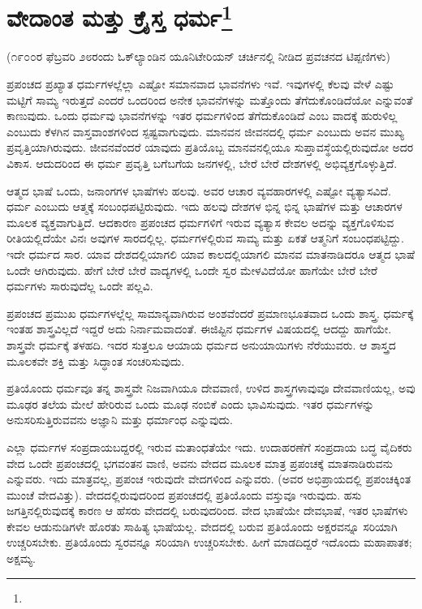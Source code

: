 
\chapter[ವೇದಾಂತ ಮತ್ತು ಕ್ರೈಸ್ತ ಧರ್ಮ]{ವೇದಾಂತ ಮತ್ತು ಕ್ರೈಸ್ತ ಧರ್ಮ\protect\footnote{}}

\begin{center}
(೧೯೦೦ರ ಫೆಬ್ರವರಿ ೨೮ರಂದು ಓಕ್‌ಲ್ಯಾಂಡಿನ ಯೂನಿಟೇರಿಯನ್ ಚರ್ಚಿನಲ್ಲಿ ನೀಡಿದ ಪ್ರವಚನದ ಟಿಪ್ಪಣಿಗಳು)
\end{center}

ಪ್ರಪಂಚದ ಪ್ರಖ್ಯಾತ ಧರ್ಮಗಳಲ್ಲೆಲ್ಲಾ ಎಷ್ಟೋ ಸಮಾನವಾದ ಭಾವನೆಗಳು ಇವೆ. ಇವುಗಳಲ್ಲಿ ಕೆಲವು ವೇಳೆ ಎಷ್ಟು ಮಟ್ಟಿಗೆ ಸಾಮ್ಯ ಇರುತ್ತದೆ ಎಂದರೆ ಒಂದರಿಂದ ಅನೇಕ ಭಾವನೆಗಳನ್ನು ಮತ್ತೊಂದು ತೆಗೆದುಕೊಂಡಿದೆಯೋ ಎನ್ನುವಂತೆ ಕಾಣುವುದು. ಒಂದು ಧರ್ಮವು ಭಾವನೆಗಳನ್ನು ಇತರ ಧರ್ಮಗಳಿಂದ ತೆಗೆದುಕೊಂಡಿದೆ ಎಂಬ ವಾದಕ್ಕೆ ಹುರುಳಿಲ್ಲ ಎಂಬುದು ಕೆಳಗಿನ ವಾಸ್ತವಾಂಶಗಳಿಂದ ಸ್ಪಷ್ಟವಾಗುವುದು. ಮಾನವನ ಜೀವನದಲ್ಲಿ ಧರ್ಮ ಎಂಬುದು ಅವನ ಮುಖ್ಯ ಪ್ರವೃತ್ತಿಯಾಗಿರುವುದು. ಜೀವನವೆಂದರೆ ಯಾವುದು ಪ್ರತಿಯೊಬ್ಬ ಮಾನವನಲ್ಲಿಯೂ ಸುಪ್ತಾವಸ್ಥೆಯಲ್ಲಿರುವುದೋ ಅದರ ವಿಕಾಸ. ಆದುದರಿಂದ ಈ ಧರ್ಮ ಪ್ರವೃತ್ತಿ ಬಗೆಬಗೆಯ ಜನಗಳಲ್ಲಿ, ಬೇರೆ ಬೇರೆ ದೇಶಗಳಲ್ಲಿ ಅಭಿವ್ಯಕ್ತಗೊಳ್ಳುತ್ತಿದೆ.

ಆತ್ಮದ ಭಾಷೆ ಒಂದು, ಜನಾಂಗಗಳ ಭಾಷೆಗಳು ಹಲವು. ಅವರ ಆಚಾರ ವ್ಯವಹಾರಗಳಲ್ಲಿ ಎಷ್ಟೋ ವ್ಯತ್ಯಾಸವಿದೆ. ಧರ್ಮ ಎಂಬುದು ಆತ್ಮಕ್ಕೆ ಸಂಬಂಧಪಟ್ಟಿರುವುದು. ಇದು ಹಲವು ದೇಶಗಳ ಭಿನ್ನ ಭಿನ್ನ ಭಾಷೆಗಳ ಮತ್ತು ಆಚಾರಗಳ ಮೂಲಕ ವ್ಯಕ್ತವಾಗುತ್ತಿದೆ. ಆದಕಾರಣ ಪ್ರಪಂಚದ ಧರ್ಮಗಳಿಗೆ ಇರುವ ವ್ಯತ್ಯಾಸ ಕೇವಲ ಅದನ್ನು ವ್ಯಕ್ತಗೊಳಿಸುವ ರೀತಿಯಲ್ಲಿದೆಯೇ ವಿನಃ ಅವುಗಳ ಸಾರದಲ್ಲಿಲ್ಲ. ಧರ್ಮಗಳಲ್ಲಿರುವ ಸಾಮ್ಯ ಮತ್ತು ಏಕತೆ ಆತ್ಮನಿಗೆ ಸಂಬಂಧಪಟ್ಟಿದ್ದು. ಇದೇ ಧರ್ಮದ ಸಾರ. ಯಾವ ದೇಶದಲ್ಲಿಯಾಗಲಿ ಯಾವ ಕಾಲದಲ್ಲಿಯಾಗಲಿ ಮಾನವ ಮಾತನಾಡಿದರೂ ಆತ್ಮದ ಭಾಷೆ ಒಂದೇ ಆಗಿರುವುದು. ಹೇಗೆ ಬೇರೆ ಬೇರೆ ವಾದ್ಯಗಳಲ್ಲಿ ಒಂದೇ ಸ್ವರ ಮೇಳವಿದೆಯೋ ಹಾಗೆಯೇ ಬೇರೆ ಬೇರೆ ಧರ್ಮಗಳು ಸಾರುವುದೆಲ್ಲ ಒಂದೇ ಪಲ್ಲವಿ.

ಪ್ರಪಂಚದ ಪ್ರಮುಖ ಧರ್ಮಗಳಲ್ಲೆಲ್ಲ ಸಾಮಾನ್ಯವಾಗಿರುವ ಅಂಶವೆಂದರೆ ಪ್ರಮಾಣಭೂತವಾದ ಒಂದು ಶಾಸ್ತ್ರ. ಧರ್ಮಕ್ಕೆ ಇಂತಹ ಶಾಸ್ತ್ರವಿಲ್ಲದೆ ಇದ್ದರೆ ಅದು ನಿರ್ನಾಮವಾದಂತೆ. ಈಜಿಪ್ಟಿನ ಧರ್ಮಗಳ ವಿಷಯದಲ್ಲಿ ಆದದ್ದು ಹಾಗೆಯೇ. ಶಾಸ್ತ್ರವೇ ಧರ್ಮಕ್ಕೆ ತಳಹದಿ. ಇದರ ಸುತ್ತಲೂ ಆಯಾಯ ಧರ್ಮದ ಅನುಯಾಯಿಗಳು ನೆರೆಯುವರು. ಆ ಶಾಸ್ತ್ರದ ಮೂಲಕವೇ ಶಕ್ತಿ ಮತ್ತು ಸಿದ್ಧಾಂತ ಸಂಚರಿಸುವುದು.

ಪ್ರತಿಯೊಂದು ಧರ್ಮವೂ ತನ್ನ ಶಾಸ್ತ್ರವೇ ನಿಜವಾಗಿಯೂ ದೇವವಾಣಿ, ಉಳಿದ ಶಾಸ್ತ್ರಗಳಾವುವೂ ದೇವವಾಣಿಯಲ್ಲ, ಅವು ಮೂಢರ ತಲೆಯ ಮೇಲೆ ಹೇರಿರುವ ಒಂದು ಮೂಢ ನಂಬಿಕೆ ಎಂದು ಭಾವಿಸುವುದು. ಇತರ ಧರ್ಮಗಳನ್ನು ಅನುಸರಿಸುತ್ತಿರುವವನು ಅಜ್ಞಾನಿ ಮತ್ತು ಧರ್ಮಾಂಧ ಎನ್ನುವುದು.

ಎಲ್ಲಾ ಧರ್ಮಗಳ ಸಂಪ್ರದಾಯಬದ್ದರಲ್ಲಿ ಇರುವ ಮತಾಂಧತೆಯೇ ಇದು. ಉದಾಹರಣೆಗೆ ಸಂಪ್ರದಾಯ ಬದ್ಧ ವೈದಿಕರು ವೇದ ಒಂದೇ ಪ್ರಪಂಚದಲ್ಲಿ ಭಗವಂತನ ವಾಣಿ, ಅವನು ವೇದದ ಮೂಲಕ ಮಾತ್ರ ಪ್ರಪಂಚಕ್ಕೆ ಮಾತನಾಡಿರುವನು ಎನ್ನುವರು. ಇದು ಮಾತ್ರವಲ್ಲ, ಪ್ರಪಂಚ ಇರುವುದೇ ವೇದಗಳಿಂದ ಎನ್ನುವರು. (ಅವರ ಅಭಿಪ್ರಾಯದಲ್ಲಿ ಪ್ರಪಂಚಕ್ಕಿಂತ ಮುಂಚೆ ವೇದವಿತ್ತು). ವೇದದಲ್ಲಿರುವುದರಿಂದ ಪ್ರಪಂಚದಲ್ಲಿ ಪ್ರತಿಯೊಂದು ವಸ್ತುವೂ ಇರುವುದು. ಹಸು ಜಗತ್ತಿನಲ್ಲಿರುವುದಕ್ಕೆ ಕಾರಣ ಆ ಹೆಸರು ವೇದದಲ್ಲಿ ಬರುವುದರಿಂದ. ವೇದ ಭಾಷೆಯೇ ದೇವಭಾಷೆ, ಇತರ ಭಾಷೆಗಳು ಕೇವಲ ಆಡುನುಡಿಗಳೇ ಹೊರತು ಸಾಹಿತ್ಯ ಭಾಷೆಯಲ್ಲ. ವೇದದಲ್ಲಿ ಬರುವ ಪ್ರತಿಯೊಂದು ಅಕ್ಷರವನ್ನೂ ಸರಿಯಾಗಿ ಉಚ್ಚರಿಸಬೇಕು. ಪ್ರತಿಯೊಂದು ಸ್ವರವನ್ನೂ ಸರಿಯಾಗಿ ಉಚ್ಚರಿಸಬೇಕು. ಹೀಗೆ ಮಾಡದಿದ್ದರೆ ಇದೊಂದು ಮಹಾಪಾತಕ; ಅಕ್ಷಮ್ಯ.

